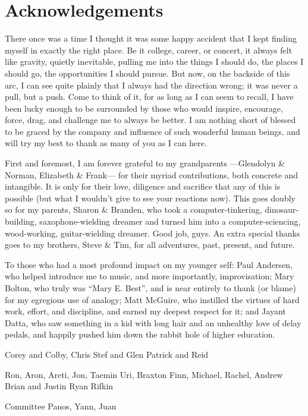 
\chapter*{Acknowledgements}

There once was a time I thought it was some happy accident that I kept finding myself in exactly the right place.
Be it college, career, or concert, it always felt like gravity, quietly inevitable, pulling me into the things I should do, the places I should go, the opportunities I should pursue.
But now, on the backside of this arc, I can see quite plainly that I always had the direction wrong; it was never a pull, but a push.
Come to think of it, for as long as I can seem to recall, I have been lucky enough to be surrounded by those who would inspire, encourage, force, drag, and challenge me to always be better.
I am nothing short of blessed to be graced by the company and influence of such wonderful human beings, and will try my best to thank as many of you as I can here.

First and foremost, I am forever grateful to my grandparents ---Glendolyn \& Norman, Elizabeth \& Frank--- for their myriad contributions, both concrete and intangible.
It is only for their love, diligence and sacrifice that any of this is possible (but what I wouldn't give to see your reactions now).
This goes doubly so for my parents, Sharon \& Branden, who took a computer-tinkering, dinosaur-building, saxophone-wielding dreamer and turned him into a computer-sciencing, wood-working, guitar-wielding dreamer.
Good job, guys.
An extra special thanks goes to my brothers, Steve \& Tim, for all adventures, past, present, and future.

To those who had a most profound impact on my younger self:
Paul Andersen, who helped introduce me to music, and more importantly, improvisation;
Mary Bolton, who truly was ``Mary E. Best'', and is near entirely to thank (or blame) for my egregious use of analogy;
Matt McGuire, who instilled the virtues of hard work, effort, and discipline, and earned my deepest respect for it;
and Jayant Datta, who saw something in a kid with long hair and an unhealthy love of delay pedals, and happily pushed him down the rabbit hole of higher education.

Corey and Colby,
Chris Stef and Glen
Patrick and Reid

Ron, Aron, Areti, Jon, Taemin
Uri, Braxton
Finn, Michael, Rachel, Andrew
Brian and Justin
Ryan Rifkin

Committee
Panos,
Yann,
Juan

